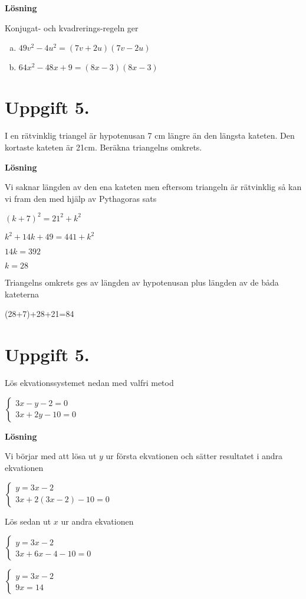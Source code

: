 \documentclass{article}
\begin{document}
\textbf{Lösning}

Konjugat- och kvadrerings-regeln ger
\begin{enumerate}[(a)]
\item $49v^2-4u^2=(7v+2u)(7v-2u)$
\item $64x^2-48x+9=(8x-3)(8x-3)$
\end{enumerate}

\section*{Uppgift 5.}
I en rätvinklig triangel är hypotenusan 7 cm längre än den längsta kateten. Den kortaste kateten är 21cm. Beräkna triangelns omkrets.

\textbf{Lösning}

Vi saknar längden av den ena kateten men eftersom triangeln är rätvinklig så kan vi fram den med hjälp av Pythagoras sats

$(k+7)^2=21^2+k^2$

$k^2+14k+49=441+k^2$

$14k=392$

$k=28$

Triangelns omkrets ges av längden av hypotenusan plus längden av de båda kateterna

(28+7)+28+21=84
\section*{Uppgift 5.}
Lös ekvationssystemet nedan med valfri metod

$\begin{cases}
3x-y-2=0\\
3x+2y-10=0
\end{cases}$

\textbf{Lösning}

Vi börjar med att lösa ut $y$ ur första ekvationen och sätter resultatet i andra ekvationen

$\begin{cases}
y=3x-2\\
3x+2(3x-2)-10=0
\end{cases}$

Lös sedan ut $x$ ur andra ekvationen

$\begin{cases}
y=3x-2\\
3x+6x-4-10=0
\end{cases}$

$\begin{cases}
y=3x-2\\
9x=14
\end{cases}$
\end{document}
